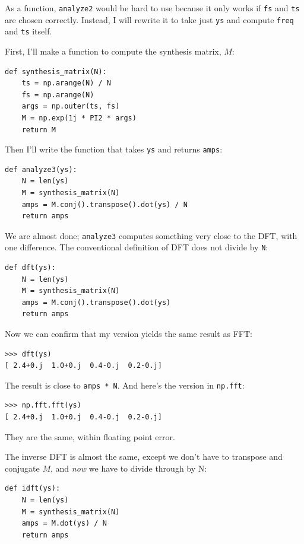 \documentclass[12pt]{book}
\begin{document}
As a function, {\tt analyze2} would be hard to use because it
only works if {\tt fs} and {\tt ts} are chosen correctly.
Instead, I will rewrite it to take just {\tt ys} and compute {\tt freq}
and {\tt ts} itself.

First, I'll make a function to compute the synthesis matrix, $M$:

\begin{verbatim}
def synthesis_matrix(N):
    ts = np.arange(N) / N
    fs = np.arange(N)
    args = np.outer(ts, fs)
    M = np.exp(1j * PI2 * args)
    return M
\end{verbatim}

Then I'll write the function that takes {\tt ys} and returns 
{\tt amps}:

\begin{verbatim}
def analyze3(ys):
    N = len(ys)
    M = synthesis_matrix(N)
    amps = M.conj().transpose().dot(ys) / N
    return amps
\end{verbatim}

We are almost done; {\tt analyze3} computes something very
close to the DFT, with one difference.  The conventional definition
of DFT does not divide by {\tt N}:

\begin{verbatim}
def dft(ys):
    N = len(ys)
    M = synthesis_matrix(N)
    amps = M.conj().transpose().dot(ys)
    return amps
\end{verbatim}

Now we can confirm that my version yields the same result as
FFT:

\begin{verbatim}
>>> dft(ys)
[ 2.4+0.j  1.0+0.j  0.4-0.j  0.2-0.j]
\end{verbatim}

The result is close to {\tt amps * N}.
And here's the version in {\tt np.fft}:

\begin{verbatim}
>>> np.fft.fft(ys)
[ 2.4+0.j  1.0+0.j  0.4-0.j  0.2-0.j]
\end{verbatim}

They are the same, within floating point error.

The inverse DFT is almost the same, except we don't have to transpose
and conjugate $M$, and {\em now} we have to divide through by N:

\begin{verbatim}
def idft(ys):
    N = len(ys)
    M = synthesis_matrix(N)
    amps = M.dot(ys) / N
    return amps
\end{verbatim}
\end{document}
